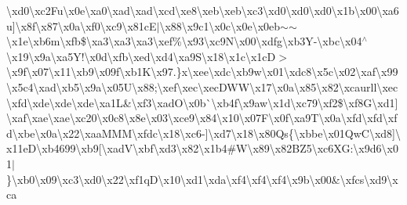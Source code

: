 \begin{DoxyCompactItemize}
\textbackslash{}xd0\textbackslash{}xc2\+Fu\textbackslash{}x0e\textbackslash{}xa0\textbackslash{}xad\textbackslash{}xad\textbackslash{}xcd\textquotesingle{}\textbackslash{}xe8\textbackslash{}xeb\textbackslash{}xeb\textbackslash{}xc3\textbackslash{}xd0\textbackslash{}xd0\textbackslash{}xd0\textbackslash{}x1b\textbackslash{}x00\textbackslash{}xa6u\mbox{]}\textbackslash{}x8f\textbackslash{}x87\textbackslash{}x0a\textbackslash{}xf0\textbackslash{}xc9\textbackslash{}x81c\+E$\vert$\textbackslash{}x88\textbackslash{}x9c1\textbackslash{}x0c\textbackslash{}x0e\textbackslash{}x0eb$\sim$$\sim$\textbackslash{}x1e\textbackslash{}xb6m\textbackslash{}xfb\$\textbackslash{}xa3\textbackslash{}xa3\textbackslash{}xa3\textbackslash{}xef\%\textbackslash{}x93\textbackslash{}xc9\+N\textbackslash{}x00\textbackslash{}xdfg\textbackslash{}xb3\+Y-\/\textbackslash{}xbc\textbackslash{}x04$^\wedge$\textbackslash{}x19\textbackslash{}x9a\textbackslash{}xa5\+Y!\textbackslash{}x0d\textbackslash{}xfb\textbackslash{}xed\textbackslash{}xd4\textbackslash{}xa9\+S\textbackslash{}x18\textbackslash{}x1c\textbackslash{}x1c\+D$>$\textbackslash{}x9f\textbackslash{}x07\textbackslash{}x11\textbackslash{}xb9\textbackslash{}x09f\textbackslash{}xb1\+K\textbackslash{}x97.\}x\textbackslash{}xee\textbackslash{}xdc\textbackslash{}xb9w\textbackslash{}x01\textbackslash{}xdc8\textbackslash{}x5c\textbackslash{}x02\textbackslash{}xaf\textbackslash{}x99\textbackslash{}x5c4\textbackslash{}xad\textbackslash{}xb5\textbackslash{}x9a\textbackslash{}x05\+U\textbackslash{}x88;\textbackslash{}xef\textbackslash{}xec\textbackslash{}xec\+D\+W\+W\textbackslash{}x17\textbackslash{}x0a\textbackslash{}x85\textbackslash{}x82\textbackslash{}xcaurll\textbackslash{}xec\textbackslash{}xfd\textbackslash{}xde\textbackslash{}xde\textbackslash{}xde\textbackslash{}xa1\+L\&\textbackslash{}xf3\textbackslash{}xad\+O\textbackslash{}x0b\`{}\textbackslash{}xb4f\textbackslash{}x9aw\textbackslash{}x1d\textbackslash{}xc79\textbackslash{}xf2\$\textbackslash{}xf8\+G\textbackslash{}xd1\mbox{]}\textbackslash{}xaf\textbackslash{}xae\textbackslash{}xae\textbackslash{}xc20\textbackslash{}x0c8\textbackslash{}x8e\textbackslash{}x03\textbackslash{}xce9\textbackslash{}x84\textbackslash{}x10\textbackslash{}x07\+F\textbackslash{}x0f\textbackslash{}xa9\+T\textbackslash{}x0a\textbackslash{}xfd\textbackslash{}xfd\textbackslash{}xfd\textbackslash{}xbe\textbackslash{}x0a\textbackslash{}x22\textbackslash{}xaa\+M\+M\+M\textbackslash{}xfdc\textbackslash{}x18\textbackslash{}xc6-\/\mbox{]}\textbackslash{}xd7\textquotesingle{}\textbackslash{}x18\textbackslash{}x80\+Qs\{\textbackslash{}xbbe\textbackslash{}x01\+Qw\+C\textbackslash{}xd8\mbox{]}\textbackslash{}x11e\+D\textbackslash{}xb4699\textbackslash{}xb9\mbox{[}\textbackslash{}xad\+V\textbackslash{}xbf\textbackslash{}xd3\textbackslash{}x82\textbackslash{}x1b4\#\+W\textbackslash{}x89\textbackslash{}x82\+B\+Z5\textbackslash{}xc6\+X\+G\+:\textbackslash{}x9d6\textbackslash{}x01$\vert$\}\textbackslash{}xb0\textbackslash{}x09\textbackslash{}xc3\textbackslash{}xd0\textbackslash{}x22\textbackslash{}xf1q\+D\textbackslash{}x10\textbackslash{}xd1\textbackslash{}xda\textbackslash{}xf4\textbackslash{}xf4\textbackslash{}xf4\textbackslash{}x9b\textbackslash{}x00\&\textbackslash{}xfcs\textbackslash{}xd9\textbackslash{}xca\textbacksla
\end{DoxyCompactItemize}
